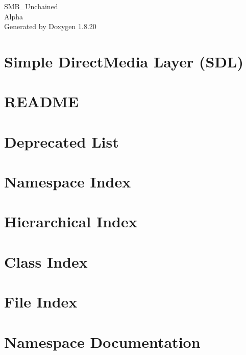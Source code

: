 \let\mypdfximage\pdfximage\def\pdfximage{\immediate\mypdfximage}\documentclass[twoside]{book}
\newcommand{\+}{\discretionary{\mbox{\scriptsize$\hookleftarrow$}}{}{}}
\newcommand{\clearemptydoublepage}{%
  \newpage{\pagestyle{empty}\cleardoublepage}%
}
\begin{document}
\hypersetup{pageanchor=false,
             bookmarksnumbered=true,
             pdfencoding=unicode
            }
\begin{titlepage}
\vspace*{7cm}
\begin{center}%
{\Large S\+M\+B\+\_\+\+Unchained \\[1ex]\large Alpha }\\
\vspace*{1cm}
{\large Generated by Doxygen 1.8.20}\\
\end{center}
\end{titlepage}
\clearemptydoublepage
{}
\tableofcontents
\clearemptydoublepage
{}
\hypersetup{pageanchor=true}

\chapter{Simple Direct\+Media Layer (S\+DL)}
\label{index}\hypertarget{index}{}
\chapter{R\+E\+A\+D\+ME}
\label{md__c____projects__jacco_template__r_e_a_d_m_e}

\chapter{Deprecated List}
\label{deprecated}

\chapter{Namespace Index}

\chapter{Hierarchical Index}

\chapter{Class Index}

\chapter{File Index}

\chapter{Namespace Documentation}














\end{document}
